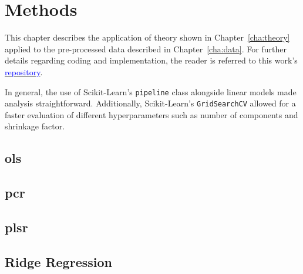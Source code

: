 \chapter{Methods}
\label{cha:methods}

This chapter describes the application of theory shown in Chapter~\ref{cha:theory} applied to the pre-processed data described in Chapter~\ref{cha:data}. For further details regarding coding and implementation, the reader is referred to this work's \href{https://github.com/cosmourao/thesis}{\textcolor{blue}{repository}}.

In general, the use of Scikit-Learn's \texttt{pipeline} class alongside linear models made analysis straightforward. Additionally, Scikit-Learn's \texttt{GridSearchCV} allowed for a faster evaluation of different hyperparameters such as number of components and shrinkage factor. 

\section{\acrlong{ols}}
\label{sec:met-ols}


\section{\acrlong{pcr}}
\label{sec:met-pcr}

\section{\acrlong{plsr}}
\label{sec:met-plsr}

\section{Ridge Regression}
\label{sec:met-ridge}